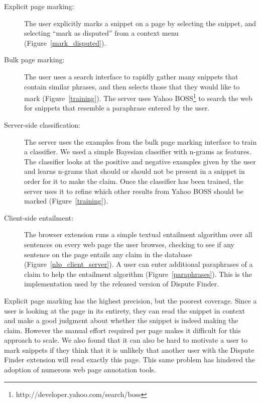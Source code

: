 \documentclass{www2010-submission}
\newcommand{\todo}[1]{}
\begin{document}
\label{sec:explicit_mark}
\begin{description}
\item[Explicit page marking:] The user explicitly marks a snippet on a page by selecting the snippet, and selecting ``mark as disputed'' from a context menu (Figure~\ref{mark_disputed}).

\item[Bulk page marking:] The user uses a search interface to rapidly gather many snippets that contain similar phrases, and then selects those that they would like to mark (Figure~\ref{training}). The server uses Yahoo BOSS\footnote{http://developer.yahoo.com/search/boss} to search the web for snippets that resemble a paraphrase entered by the user. 

\item[Server-side classification:] The server uses the examples from the bulk page marking interface to train a classifier. We used a simple Bayesian classifier with n-grams as features. The classifier looks at the positive and negative examples given by the user and learns n-grams that should or should not be present in a snippet in order for it to make the claim.  Once the classifier has been trained, the server uses it to refine which other results from Yahoo BOSS should be marked (Figure~\ref{training}).

\todo{Should we say that we didn't completely finish this version?}

\todo{Has anyone done something like this before.}
\todo{We only partially implemented this approach}

\item[Client-side entailment:] The browser extension runs a simple textual entailment algorithm over all sentences on every web page the user browses, checking to see if any sentence on the page entails any claim in the database (Figure~\ref{nlp_client_server}). A user can enter additional paraphrases of a claim to help the entailment algorithm (Figure~\ref{paraphrases}). This is the implementation used by the released version of Dispute Finder.
\end{description}

Explicit page marking has the highest precision, but the poorest coverage. Since a user is looking at the page in its entirety, they can read the snippet in context and make a good judgment about whether the snippet is indeed making the claim. However the manual effort required per page makes it difficult for this approach to scale. We also found that it can also be hard to motivate a user to mark snippets if they think that it is unlikely that another user with the Dispute Finder extension will read exactly this page. This same problem has hindered the adoption of numerous web page annotation tools.
\end{document}
